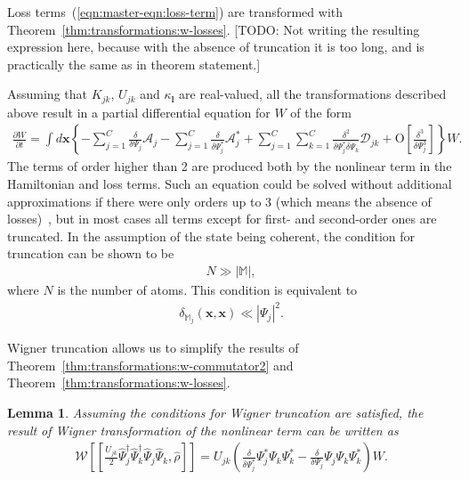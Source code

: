 \documentclass[12pt,aip,jmp,amssymb,amsmath]{revtex4-1}
\newtheorem{lemma}{Lemma}
\begin{document}
Loss terms~(\ref{eqn:master-eqn:loss-term}) are transformed with Theorem~\ref{thm:transformations:w-losses}.
[TODO: Not writing the resulting expression here, because with the absence of truncation it is too long, and is practically the same as in theorem statement.]

Assuming that $K_{jk}$, $U_{jk}$ and $\kappa_{\boldsymbol{l}}$ are real-valued, all the transformations described above result in a partial differential equation for $W$ of the form
\begin{equation}\begin{split}
    \frac{\partial W}{\partial t} = \int d\boldsymbol{x} \left\{
        - \sum_{j=1}^C \frac{\delta}{\delta \Psi_j} \mathcal{A}_j
        - \sum_{j=1}^C \frac{\delta}{\delta \Psi_j^*} \mathcal{A}_j^*
        + \sum_{j=1}^C \sum_{k=1}^C \frac{\delta^2}{\delta \Psi_j^* \delta \Psi_k} \mathcal{D}_{jk}
        + \mbox{O} \left[ \frac{\delta^3}{\delta\Psi_j^3} \right]
    \right\} W.
\end{split}\end{equation}
The terms of order higher than 2 are produced both by the nonlinear term in the Hamiltonian and loss terms.
Such an equation could be solved without additional approximations if there were only orders up to 3 (which means the absence of losses)~\cite{Polkovnikov2003}, but in most cases all terms except for first- and second-order ones are truncated.
In the assumption of the state being coherent, the condition for truncation can be shown to be~\cite{Sinatra2002}
\begin{equation}\begin{split}
    N \gg |\mathbb{M}|,
\end{split}\end{equation}
where $N$ is the number of atoms.
This condition is equivalent to~\cite{Norrie2006}
\begin{equation}\begin{split}
    \delta_{\mathbb{M}_j}(\boldsymbol{x}, \boldsymbol{x}) \ll | \Psi_j |^2.
\end{split}\end{equation}

Wigner truncation allows us to simplify the results of Theorem~\ref{thm:transformations:w-commutator2} and Theorem~\ref{thm:transformations:w-losses}.

\begin{lemma}
    Assuming the conditions for Wigner truncation are satisfied,
    the result of Wigner transformation of the nonlinear term can be written as
    \begin{equation*}\begin{split}
        \mathcal{W} \left[
            [
                \frac{U_{jk}}{2}
                    \hat{\Psi}_j^\dagger \hat{\Psi}_k^\dagger \hat{\Psi}_j \hat{\Psi}_k,
                \hat{\rho}
            ]
        \right]
        = U_{jk} \left(
            \frac{\delta}{\delta \Psi_j^*} \Psi_j^* \Psi_k \Psi_k^*
            - \frac{\delta}{\delta \Psi_j} \Psi_j \Psi_k \Psi_k^*
        \right) W.
    \end{split}\end{equation*}
\end{lemma}
\end{document}
